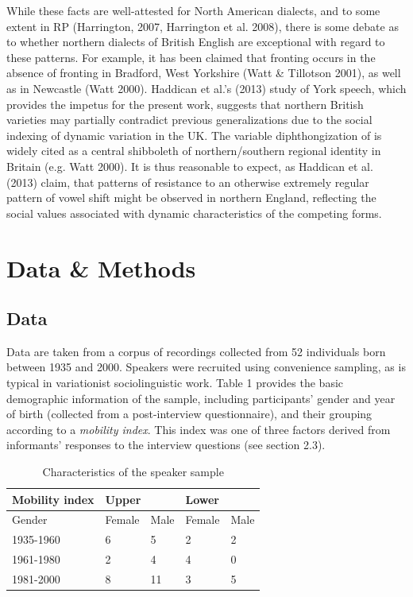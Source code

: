 \documentclass[12pt]{article}
\begin{document}
While these facts are well-attested for North American dialects, and to some extent in RP (Harrington, 2007, Harrington et al. 2008), there is some debate as to whether northern dialects of British English are exceptional with regard to these patterns. For example, it has been claimed that  fronting occurs in the absence of  fronting in Bradford, West Yorkshire (Watt \& Tillotson 2001), as well as in Newcastle (Watt 2000). Haddican et al.'s (2013) study of York speech, which provides the impetus for the present work, suggests that northern British varieties may partially contradict previous generalizations due to the social indexing of dynamic  variation in the UK. The variable diphthongization of  is widely cited as a central shibboleth of northern/southern regional identity in Britain (e.g. Watt 2000). It is thus reasonable to expect, as Haddican et al. (2013) claim, that patterns of resistance to an otherwise extremely regular pattern of vowel shift might be observed in northern England, reflecting the social values associated with dynamic characteristics of the competing forms.

\section{Data \& Methods}

\subsection{Data}

Data are taken from a corpus of recordings collected from 52 individuals born between 1935 and 2000. Speakers were recruited using convenience sampling, as is typical in variationist sociolinguistic work. Table 1 provides the basic demographic information of the sample, including participants' gender and year of birth (collected from a post-interview questionnaire), and their grouping according to a \textit{mobility index}. This index was one of three factors derived from informants' responses to the interview questions (see section 2.3).

\vspace*{6pt}
\begin{table}[htbp]
\centering
\begin{tabular}{l|l|l|l|l}
Mobility index&\multicolumn{2}{l|}{Upper}&\multicolumn{2}{l}{Lower}\\
\hline
Gender& Female& Male & Female & Male\\
\hline
1935-1960 & 6&5&2&2\\
 1961-1980& 2 &4&4&0\\
1981-2000&  8&11&3&5\\

\end{tabular}
\caption{Characteristics of the speaker sample}
\end{table}
\vspace*{6pt}
\end{document}
